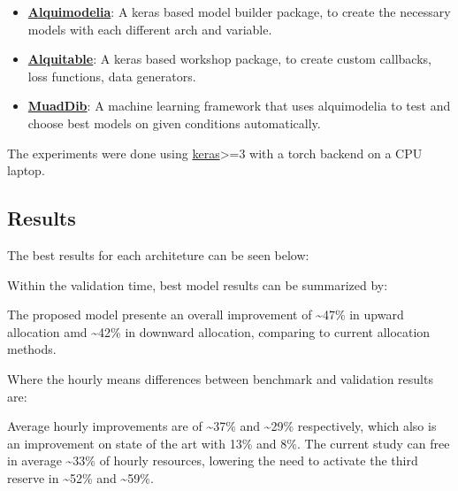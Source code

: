 \begin{itemize}
    \item \textbf{\href{https://github.com/alquimodelia/alquimodelia}{Alquimodelia}}: A keras based model builder package, to create the necessary models with each different arch and variable.
    \item \textbf{\href{https://github.com/alquimodelia/alquitable}{Alquitable}}: A keras based workshop package, to create custom callbacks, loss functions, data generators.
    \item \textbf{\href{https://github.com/alquimodelia/MuadDib}{MuadDib}}: A machine learning framework that uses alquimodelia to test and choose best models on given conditions automatically.
\end{itemize}

The experiments were done using \href{https://keras.io/}{keras}>=3 with a torch backend on a CPU laptop.

\subsection{Results}

The best results for each architeture can be seen below:



Within the validation time, best model results can be summarized by:




The proposed model presente an overall improvement of \textasciitilde47\% in upward allocation amd \textasciitilde42\% in downward allocation, comparing to current allocation methods.\par

Where the hourly means differences between benchmark and validation results are:



Average hourly improvements are of \textasciitilde37\% and \textasciitilde29\% respectively, which also is an improvement on state of the art \cite{Algarvio2024} with 13\% and 8\%.
The current study can free in average \textasciitilde33\% of hourly resources, lowering the need to activate the third reserve in \textasciitilde52\% and \textasciitilde59\%.\par



